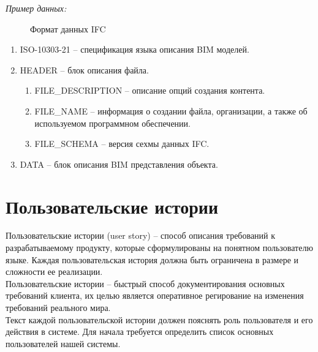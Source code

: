 \documentclass[a4paper,14pt]{extreport} %
\begin{document}
\textit{Пример данных:}
\begin{figure}[H]
\caption{Формат данных IFC}
\label{ifc-data-format}
\end{figure}
\begin{enumerate}
\item ISO-10303-21 -- спецификация языка описания BIM моделей.
\item HEADER -- блок описания файла.
\begin{enumerate}
\item FILE\_DESCRIPTION -- описание опций создания контента.
\item FILE\_NAME -- информация о создании файла, организации, а также об используемом программном обеспечении.
\item FILE\_SCHEMA -- версия сехмы данных IFC.
\end{enumerate}
\item DATA -- блок описания BIM представления объекта.
\end{enumerate}

\newpage
\section{Пользовательские истории}

Пользовательские истории (user story) -- способ описания требований к разрабатываемому продукту, которые сформулированы на понятном пользователю языке. Каждая пользовательская история должна быть ограничена в размере и сложности ее реализации. \\
Пользовательские истории -- быстрый способ документирования основных требований клиента, их целью является оперативное регирование на изменения требований реального мира. \\
Текст каждой пользовательской истории должен пояснять роль пользователя и его действия в системе. Для начала требуется определить список основных пользователей нашей системы.
\end{document}
